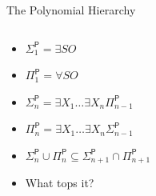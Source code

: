 \documentclass[usenames,dvipsnames]{beamer}
\newcommand{\PTime}{\mathsf{P}}
\begin{document}
\begin{frame}{The Polynomial Hierarchy}
    \begin{columns}
        \begin{column}{0.5\textwidth}
            \begin{itemize}
                \item $\Sigma^\PTime_1 = \exists SO$
                \item $\Pi^\PTime_1 = \forall SO$
                \item $\Sigma^\PTime_n = \exists X_1\ldots\exists X_n\Pi^\PTime_{n-1}$
                \item $\Pi^\PTime_n = \exists X_1\ldots\exists X_n\Sigma^\PTime_{n-1}$
                \item $\Sigma^\PTime_n\cup\Pi^\PTime_n\subseteq\Sigma^\PTime_{n+1}\cap\Pi^\PTime_{n+1}$
                \item What tops it? 
            \end{itemize}
        \end{column}
        \begin{column}{0.5\textwidth}
        \end{column}
    \end{columns}
\end{frame}
 
\end{document}

